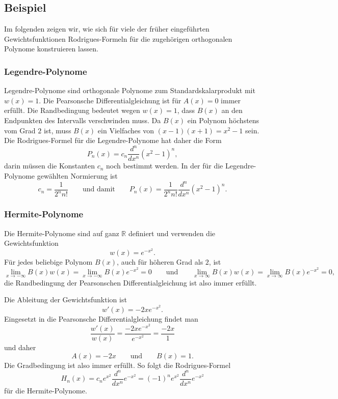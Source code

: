 \subsection{Beispiel}
Im folgenden zeigen wir, wie sich für viele der früher eingeführten
Gewichtsfunktionen Rodrigues-Formeln für die zugehörigen orthogonalen
Polynome konstruieren lassen.

%
%
\subsubsection{Legendre-Polynome}
Legendre-Polynome sind orthogonale Polynome zum Standardskalarprodukt
mit $w(x)=1$.
Die Pearsonsche Differentialgleichung ist für $A(x)=0$ immer erfüllt.
Die Randbedingung bedeutet wegen $w(x)=1$, dass $B(x)$ an den
Endpunkten des Intervalls verschwinden muss.
Da $B(x)$ ein Polynom höchstens vom Grad $2$ ist, muss $B(x)$ ein
Vielfaches von $(x-1)(x+1)=x^2-1$ sein.
Die Rodrigues-Formel für die Legendre-Polynome hat daher die Form
\[
P_n(x)
=
c_n
\frac{d^n}{dx^n}
(x^2-1)^n,
\]
darin müssen die Konstanten $c_n$ noch bestimmt werden.
In der für die Legendre-Polynome gewählten Normierung ist
\[
c_n = \frac1{2^n n!}
\qquad\text{und damit}\qquad
P_n(x)
=
\frac{1}{2^nn!}
\frac{d^n}{dx^n}
(x^2-1)^n.
\]

%
%
\subsubsection{Hermite-Polynome}
Die Hermite-Polynome sind auf ganz $\mathbb{R}$ definiert und verwenden
die Gewichtsfunktion
\[
w(x) = e^{-x^2}.
\]
Für jedes beliebige Polynom $B(x)$, auch für höheren Grad als $2$, ist
\[
\lim_{x\to-\infty} B(x) w(x)
=
\lim_{x\to-\infty} B(x)e^{-x^2}
=
0
\qquad\text{und}\qquad
\lim_{x\to\infty} B(x) w(x)
=
\lim_{x\to\infty} B(x)e^{-x^2}
=
0,
\]
die Randbedingung der Pearsonschen Differentialgleichung ist also
immer erfüllt.

Die Ableitung der Gewichtsfunktion ist
\[
w'(x) = -2xe^{-x^2}.
\]
Eingesetzt in die Pearsonsche Differentialgleichung findet man
\[
\frac{w'(x)}{w(x)}
=
\frac{-2xe^{-x^2}}{e^{-x^2}}
=
\frac{-2x}{1}
\]
und daher
\[
A(x) = -2x
\qquad\text{und}\qquad
B(x) = 1.
\]
Die Gradbedingung ist also immer erfüllt.
So folgt die Rodrigues-Formel
%
%
\begin{equation}
H_n(x)
=
c_n
e^{x^2}\frac{d^n}{dx^n} e^{-x^2}
=
(-1)^n
e^{x^2}\frac{d^n}{dx^n} e^{-x^2}
\label{buch:orthogonal:eqn:hermite-rodrigues}
\end{equation}
für die Hermite-Polynome.

